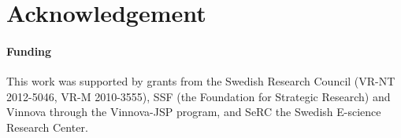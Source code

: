 \documentclass{bioinfo}
\begin{document}
\section*{Acknowledgement}

\paragraph{Funding\textcolon} %
This work was supported by grants from the Swedish
Research Council (VR-NT 2012-5046, VR-M 2010-3555), SSF (the Foundation for
Strategic Research) and Vinnova through the Vinnova-JSP program,  and SeRC the
Swedish E-science Research Center.


%
%
%
%
%
%
%

\end{document}
